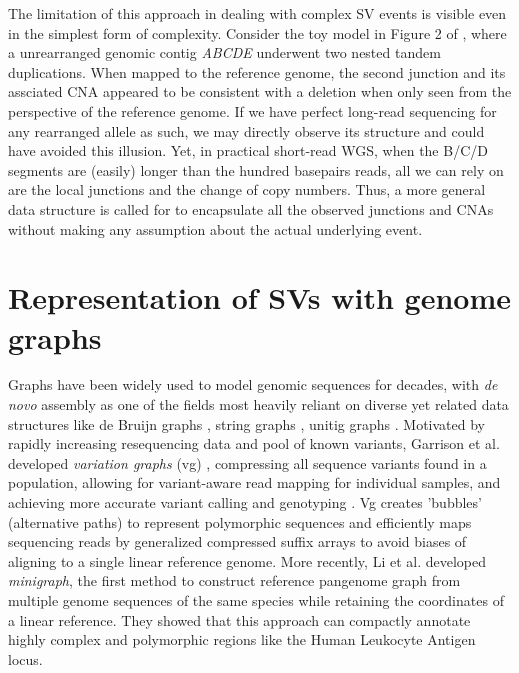 \documentclass[phd,tocprelim]{cornell}
\begin{document}
The limitation of this approach in dealing with complex SV events is visible even in the simplest form of complexity. Consider the toy model in Figure 2 of \cite{Maciejowski2016-nf}, where a unrearranged genomic contig \textit{ABCDE} underwent two nested tandem duplications. When mapped to the reference genome, the second junction and its assciated CNA appeared to be consistent with a deletion when only seen from the perspective of the reference genome. If we have perfect long-read sequencing for any rearranged allele as such, we may directly observe its structure and could have avoided this illusion. Yet, in practical short-read WGS, when the B/C/D segments are (easily) longer than the hundred basepairs reads, all we can rely on are the local junctions and the change of copy numbers. Thus, a more general data structure is called for to encapsulate all the observed junctions and CNAs without making any assumption about the actual underlying event.

\section{Representation of SVs with genome graphs}
Graphs have been widely used to model genomic sequences for decades, with \textit{de novo} assembly as one of the fields most heavily reliant on diverse yet related data structures like de Bruijn graphs \cite{Zerbino2008-cc}, string graphs \cite{Simpson2010-xe}, unitig graphs \cite{Li2012-ac}. Motivated by rapidly increasing resequencing data and pool of known variants, Garrison et al. developed \textit{variation graphs} (vg) \cite{Garrison2018-sj}, compressing all sequence variants found in a population, allowing for variant-aware read mapping for individual samples, and achieving more accurate variant calling and genotyping \cite{Hickey2020-cu,Siren2020-tf}. Vg creates 'bubbles' (alternative paths) to represent polymorphic sequences and efficiently maps sequencing reads by generalized compressed suffix arrays to avoid biases of aligning to a single linear reference genome. More recently, Li et al. \cite{Li2020-ai} developed \textit{minigraph}, the first method to construct reference pangenome graph from multiple genome sequences of the same species while retaining the coordinates of a linear reference. They showed that this approach can compactly annotate highly complex and polymorphic regions like the Human Leukocyte Antigen locus.

\end{document}

